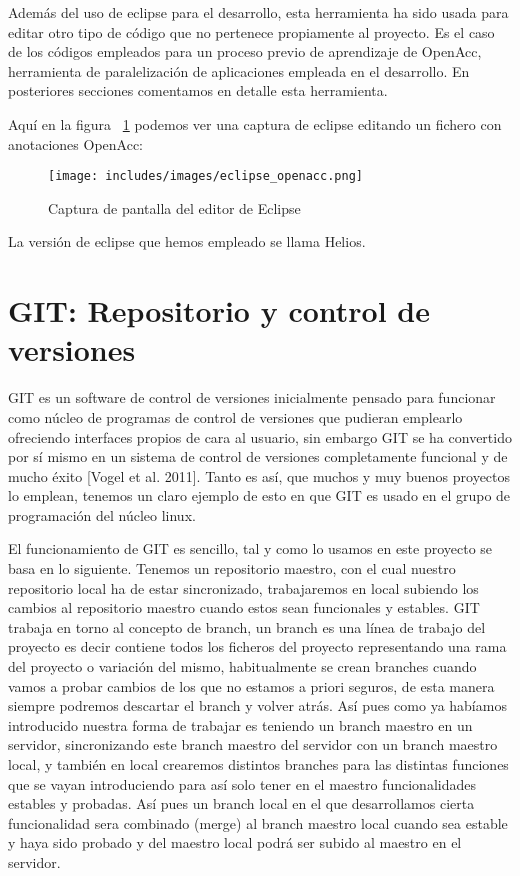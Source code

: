 Además del uso de eclipse para el desarrollo, esta herramienta ha sido usada para editar otro tipo de código que no pertenece propiamente al proyecto. Es el caso de los códigos empleados para un proceso previo de aprendizaje de OpenAcc, herramienta de paralelización de aplicaciones empleada en el desarrollo. En posteriores secciones comentamos en detalle esta herramienta.

Aquí en la figura ~\ref{fig:Eclipse} podemos ver una captura de eclipse editando un fichero con anotaciones OpenAcc:

\begin{figure}[t]
\centering
\texttt{[image: includes/images/eclipse\_openacc.png]}
\caption{Captura de pantalla del editor de Eclipse}
\label{fig:Eclipse}
\end{figure}

La versión de eclipse que hemos empleado se llama Helios.

\section{GIT: Repositorio y control de versiones}

GIT es un software de control de versiones inicialmente pensado para funcionar como núcleo de programas de control de versiones que pudieran emplearlo ofreciendo interfaces propios de cara al usuario, sin embargo GIT se ha convertido por sí mismo en un sistema de control de versiones completamente funcional y de mucho éxito [Vogel et al. 2011]. Tanto es así, que muchos y muy buenos proyectos lo emplean, tenemos un claro ejemplo de esto en que GIT es usado en el grupo de programación del núcleo linux.

El funcionamiento de GIT es sencillo, tal y como lo usamos en este proyecto se basa en lo siguiente. Tenemos un repositorio maestro, con el cual nuestro repositorio local ha de estar sincronizado, trabajaremos en local subiendo los cambios al repositorio maestro cuando estos sean funcionales y estables. GIT trabaja en torno al concepto de branch, un branch es una línea de trabajo del proyecto es decir contiene todos los ficheros del proyecto representando una rama del proyecto o variación del mismo, habitualmente se crean branches cuando vamos a probar cambios de los que no estamos a priori seguros, de esta manera siempre podremos descartar el branch y volver atrás.
Así pues como ya habíamos introducido nuestra forma de trabajar es teniendo un branch maestro en un servidor, sincronizando este branch maestro del servidor con un branch maestro local, y también en local crearemos distintos branches para las distintas funciones que se vayan introduciendo para así solo tener en el maestro funcionalidades estables y probadas. Así pues un branch local en el que desarrollamos cierta funcionalidad sera combinado (merge) al branch maestro local cuando sea estable y  haya sido probado y del maestro local podrá ser subido al maestro en el servidor.

